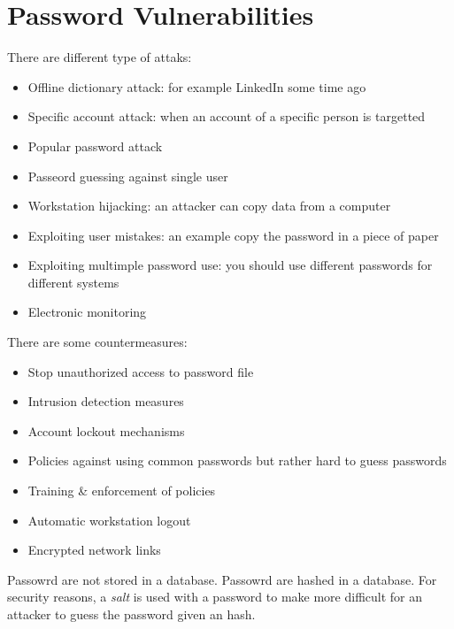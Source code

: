 \section{Password Vulnerabilities}
There are different type of attaks:
\begin{itemize}
  \item Offline dictionary attack: for example LinkedIn some time ago
  \item Specific account attack: when an account of a specific person is
targetted %
  \item Popular password attack
  \item Passeord guessing against single user
  \item Workstation hijacking: an attacker can copy data from a computer
  \item Exploiting user mistakes: an example copy the password in a piece of
paper
  \item Exploiting multimple password use: you should use different passwords
for different systems
  \item Electronic monitoring
\end{itemize}

There are some countermeasures:
\begin{itemize}
  \item Stop unauthorized access to password file
  \item Intrusion detection measures
  \item Account lockout mechanisms
  \item Policies against using common passwords but rather hard to guess
passwords
  \item Training \& enforcement of policies
  \item Automatic workstation logout
  \item Encrypted network links
\end{itemize}

Passowrd are not stored in a database. Passowrd are hashed in a database. For
security reasons, a \textit{salt} is used with a password to make more
difficult for an attacker to guess the password given an hash.


